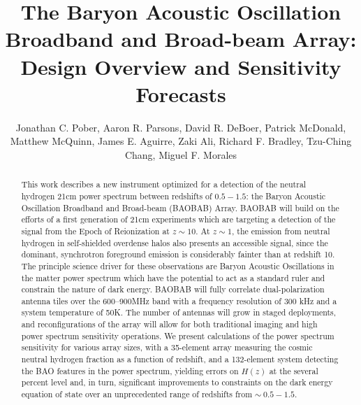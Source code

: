 \documentclass[10pt,iop]{emulateapj}
\begin{document}
\title{The Baryon Acoustic Oscillation Broadband and Broad-beam Array: Design Overview and Sensitivity Forecasts}
\author{Jonathan C. Pober, 
Aaron R. Parsons, 
David R. DeBoer,
Patrick McDonald,
Matthew McQuinn,
James E. Aguirre,
Zaki Ali,
Richard F. Bradley,
Tzu-Ching Chang,
Miguel F. Morales}


\begin{abstract}
This work describes a new instrument optimized for a detection of
the neutral hydrogen 21cm power spectrum between redshifts of $0.5-1.5$: the 
Baryon Acoustic Oscillation Broadband and Broad-beam (BAOBAB) Array.  
BAOBAB will build on the efforts of a first generation of 21cm experiments
which are targeting a detection of the signal from the Epoch of Reionization at $z\sim10$.  
At $z\sim1$, the emission from neutral hydrogen 
in self-shielded overdense halos also presents an accessible signal, 
since the dominant, synchrotron foreground emission is considerably fainter
than at redshift 10.  The principle science driver for these observations are
Baryon Acoustic Oscillations in the matter power spectrum
which have the potential to act as a standard ruler and constrain the nature of dark energy.
BAOBAB will fully correlate
dual-polarization antenna tiles over the 600--900MHz band with a frequency resolution of 
300 kHz and a system temperature of 50K.  The number of antennas will grow in 
staged deployments, and reconfigurations of the array
will allow for both traditional imaging and high power spectrum sensitivity operations.  We present
calculations of the power spectrum sensitivity for various array sizes, 
with a 35-element array measuring the cosmic neutral hydrogen 
fraction as a function of redshift, 
and a 132-element system detecting the BAO features in the power spectrum,
yielding errors on $H(z)$ at the several percent level and, in turn, significant
improvements to constraints on the dark energy equation of state over an
unprecedented range of redshifts from $\sim~0.5-1.5$.
\end{abstract}
\end{document}
